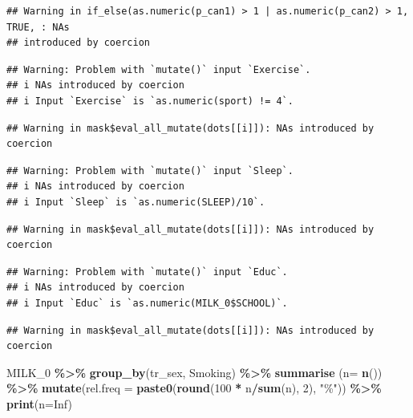 \documentclass[
]{article}
\newenvironment{Shaded}{\begin{snugshade}}{\end{snugshade}}
\newcommand{\DataTypeTok}[1]{\textcolor[rgb]{0.13,0.29,0.53}{#1}}
\newcommand{\DecValTok}[1]{\textcolor[rgb]{0.00,0.00,0.81}{#1}}
\newcommand{\KeywordTok}[1]{\textcolor[rgb]{0.13,0.29,0.53}{\textbf{#1}}}
\newcommand{\NormalTok}[1]{#1}
\newcommand{\OperatorTok}[1]{\textcolor[rgb]{0.81,0.36,0.00}{\textbf{#1}}}
\newcommand{\OtherTok}[1]{\textcolor[rgb]{0.56,0.35,0.01}{#1}}
\newcommand{\StringTok}[1]{\textcolor[rgb]{0.31,0.60,0.02}{#1}}
\begin{document}
\begin{verbatim}
## Warning in if_else(as.numeric(p_can1) > 1 | as.numeric(p_can2) > 1, TRUE, : NAs
## introduced by coercion
\end{verbatim}

\begin{verbatim}
## Warning: Problem with `mutate()` input `Exercise`.
## i NAs introduced by coercion
## i Input `Exercise` is `as.numeric(sport) != 4`.
\end{verbatim}

\begin{verbatim}
## Warning in mask$eval_all_mutate(dots[[i]]): NAs introduced by coercion
\end{verbatim}

\begin{verbatim}
## Warning: Problem with `mutate()` input `Sleep`.
## i NAs introduced by coercion
## i Input `Sleep` is `as.numeric(SLEEP)/10`.
\end{verbatim}

\begin{verbatim}
## Warning in mask$eval_all_mutate(dots[[i]]): NAs introduced by coercion
\end{verbatim}

\begin{verbatim}
## Warning: Problem with `mutate()` input `Educ`.
## i NAs introduced by coercion
## i Input `Educ` is `as.numeric(MILK_0$SCHOOL)`.
\end{verbatim}

\begin{verbatim}
## Warning in mask$eval_all_mutate(dots[[i]]): NAs introduced by coercion
\end{verbatim}

\begin{Shaded}
\begin{Highlighting}[]
\NormalTok{MILK\_}\DecValTok{0} \OperatorTok{\%\textgreater{}\%}\StringTok{ }
\StringTok{  }\KeywordTok{group\_by}\NormalTok{(tr\_sex, Smoking) }\OperatorTok{\%\textgreater{}\%}\StringTok{ }
\StringTok{  }\KeywordTok{summarise}\NormalTok{ (}\DataTypeTok{n=} \KeywordTok{n}\NormalTok{()) }\OperatorTok{\%\textgreater{}\%}
\StringTok{  }\KeywordTok{mutate}\NormalTok{(}\DataTypeTok{rel.freq =} \KeywordTok{paste0}\NormalTok{(}\KeywordTok{round}\NormalTok{(}\DecValTok{100} \OperatorTok{*}\StringTok{ }\NormalTok{n}\OperatorTok{/}\KeywordTok{sum}\NormalTok{(n), }\DecValTok{2}\NormalTok{), }\StringTok{"\%"}\NormalTok{))  }\OperatorTok{\%\textgreater{}\%}\StringTok{ }
\StringTok{  }\KeywordTok{print}\NormalTok{(}\DataTypeTok{n=}\OtherTok{Inf}\NormalTok{)}
\end{Highlighting}
\end{Shaded}
\end{document}
